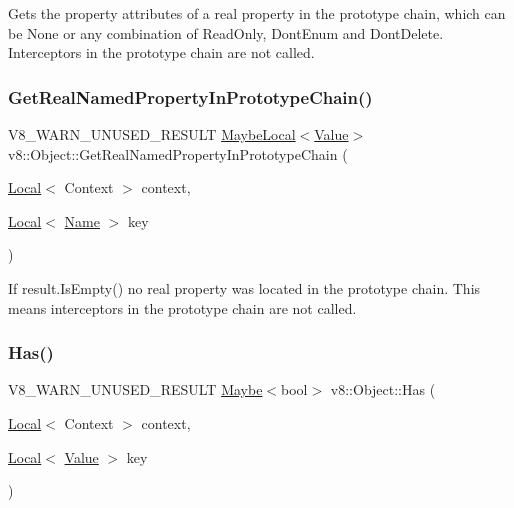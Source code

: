 Gets the property attributes of a real property in the prototype chain, which can be None or any combination of Read\+Only, Dont\+Enum and Dont\+Delete. Interceptors in the prototype chain are not called. \mbox{\label{classv8_1_1Object_afe68d490fc41783e30126ca547b7fc90}} 
\subsubsection{\texorpdfstring{Get\+Real\+Named\+Property\+In\+Prototype\+Chain()}{GetRealNamedPropertyInPrototypeChain()}}
{\footnotesize\ttfamily V8\+\_\+\+W\+A\+R\+N\+\_\+\+U\+N\+U\+S\+E\+D\+\_\+\+R\+E\+S\+U\+LT \mbox{\hyperlink{classv8_1_1MaybeLocal}{Maybe\+Local}}$<$\mbox{\hyperlink{classv8_1_1Value}{Value}}$>$ v8\+::\+Object\+::\+Get\+Real\+Named\+Property\+In\+Prototype\+Chain (\begin{DoxyParamCaption}\item[{\mbox{\hyperlink{classv8_1_1Local}{Local}}$<$ Context $>$}]{context,  }\item[{\mbox{\hyperlink{classv8_1_1Local}{Local}}$<$ \mbox{\hyperlink{classv8_1_1Name}{Name}} $>$}]{key }\end{DoxyParamCaption})}

If result.\+Is\+Empty() no real property was located in the prototype chain. This means interceptors in the prototype chain are not called. \mbox{\label{classv8_1_1Object_a57d4819c2cc13715ed22dd23cdc84d7c}} 
\subsubsection{\texorpdfstring{Has()}{Has()}}
{\footnotesize\ttfamily V8\+\_\+\+W\+A\+R\+N\+\_\+\+U\+N\+U\+S\+E\+D\+\_\+\+R\+E\+S\+U\+LT \mbox{\hyperlink{classv8_1_1Maybe}{Maybe}}$<$bool$>$ v8\+::\+Object\+::\+Has (\begin{DoxyParamCaption}\item[{\mbox{\hyperlink{classv8_1_1Local}{Local}}$<$ Context $>$}]{context,  }\item[{\mbox{\hyperlink{classv8_1_1Local}{Local}}$<$ \mbox{\hyperlink{classv8_1_1Value}{Value}} $>$}]{key }\end{DoxyParamCaption})}

